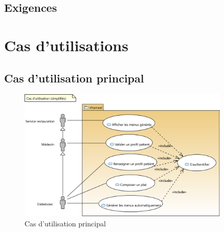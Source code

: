 \subsection{Exigences}



\section{Cas d'utilisations}

\subsection{Cas d'utilisation principal}

\begin{figure}[H]
\centering
\includegraphics[width=0.9\textwidth]{../../CasDUtilisations/uc_principal.png}
\caption{Cas d'utilisation principal}
\end{figure}










